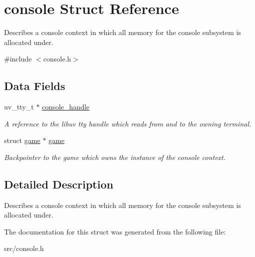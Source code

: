 \hypertarget{structconsole}{}\section{console Struct Reference}
\label{structconsole}


Describes a console context in which all memory for the console subsystem is allocated under.  




{\ttfamily \#include $<$console.\+h$>$}

\subsection*{Data Fields}
\begin{DoxyCompactItemize}
\item 
\hypertarget{structconsole_aa2a7534069d6339dea4cd3349071d125}{}uv\+\_\+tty\+\_\+t $\ast$ \hyperlink{structconsole_aa2a7534069d6339dea4cd3349071d125}{console\+\_\+handle}\label{structconsole_aa2a7534069d6339dea4cd3349071d125}

\begin{DoxyCompactList}\small\item\em A reference to the libuv tty handle which reads from and to the owning terminal. \end{DoxyCompactList}\item 
\hypertarget{structconsole_ad32c42b0f4bad4f3c78c0d3bf2bbc7f1}{}struct \hyperlink{structgame}{game} $\ast$ \hyperlink{structconsole_ad32c42b0f4bad4f3c78c0d3bf2bbc7f1}{game}\label{structconsole_ad32c42b0f4bad4f3c78c0d3bf2bbc7f1}

\begin{DoxyCompactList}\small\item\em Backpointer to the game which owns the instance of the console context. \end{DoxyCompactList}\end{DoxyCompactItemize}


\subsection{Detailed Description}
Describes a console context in which all memory for the console subsystem is allocated under. 

The documentation for this struct was generated from the following file\+:\begin{DoxyCompactItemize}
\item 
src/console.\+h\end{DoxyCompactItemize}
